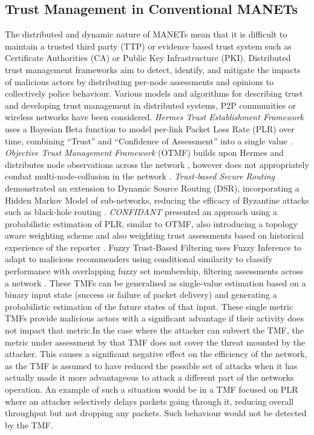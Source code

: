 \subsection{Trust Management in Conventional MANETs}
The distributed and dynamic nature of MANETs mean that it is difficult to maintain a trusted third party (TTP) or evidence based trust system such as Certificate Authorities (CA) or Public Key Infrastructure (PKI). 
Distributed trust management frameworks aim to detect, identify, and mitigate the impacts of malicious actors by distributing per-node assessments and opinions to collectively police behaviour. 
Various models and algorithms for describing trust and developing trust management in distributed systems, P2P communities or wireless networks have been considered.
\textit{Hermes Trust Establishment Framework} uses a Bayesian Beta function to model per-link Packet Loss Rate (PLR) over time, combining ``Trust'' and ``Confidence of Assessment'' into a single value \cite{Zouridaki2005}.
\textit{Objective Trust Management Framework} (OTMF) builds upon Hermes and distributes node observations across the network \cite{Li2008}, however does not appropriately combat multi-node-collusion in the network \cite{Cho2011}. 
\textit{Trust-based Secure Routing} demonstrated an extension to Dynamic Source Routing (DSR), incorporating a Hidden Markov Model of sub-networks, reducing the efficacy of Byzantine attacks such as black-hole routing  \cite{Moe2008a}. 
\textit{CONFIDANT} presented an approach using a probabilistic estimation of PLR, similar to OTMF, also introducing a topology aware weighting scheme and also weighting trust assessments based on historical experience of the reporter \cite{Buchegger2002}. Fuzzy Trust-Based Filtering uses Fuzzy Inference to adapt to malicious recommenders using conditional similarity to classify performance with overlapping fuzzy set membership, filtering assessments across a network \cite{Luo2008}. 
These TMFs can be generalised as single-value estimation based on a binary input state (success or failure of packet delivery) and generating a probabilistic estimation of the future states of that input. These single metric TMFs provide malicious actors with a significant advantage if their activity does not impact that metric.In the case where the attacker can subvert the TMF, the metric under assessment by that TMF does not cover the threat mounted by the attacker. This causes a significant negative effect on the efficiency of the network, as the TMF is assumed to have reduced the possible set of attacks when it has actually made it more advantageous to attack a different part of the networks operation.
An example of such a situation would be in a TMF focused on PLR where an attacker selectively delays packets going through it, reducing overall throughput but not dropping any packets. Such behaviour would not be detected by the TMF.

